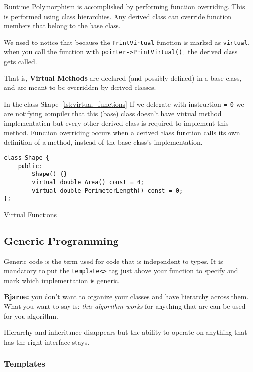 \documentclass[11pt, a4paper]{article}
\begin{document}
Runtime Polymorphism is accomplished by performing function overriding. This is performed using class hierarchies. Any derived class can override function members that belong to the base class.

We need to notice that because the \texttt{PrintVirtual} function is marked as \texttt{virtual}, when you call the function with \texttt{pointer->PrintVirtual();} the derived class gets called.

That is, \textbf{Virtual Methods} are declared (and possibly defined) in a base class, and are meant to be overridden by derived classes.


In the class Shape~\ref{lst:virtual_functions} If we delegate with instruction \texttt{= 0} we are notifying compiler that this (base) class doesn't have virtual method implementation but every other derived class is required to implement this method.
Function overriding occurs when a derived class function calls its own definition of a method, instead of the base class's implementation. 

\begin{listing}
\begin{verbatim}
class Shape {
	public:
		Shape() {}
		virtual double Area() const = 0;
		virtual double PerimeterLength() const = 0;
};
\end{verbatim}
\caption{Virtual Functions}
\label{lst:virtual_functions}
\end{listing}






\subsection{Generic Programming}%
\label{ssub:generic_programming}

Generic code is the term used for code that is independent to types. It is mandatory to put the \texttt{template<>} tag just above your function to specify and mark which implementation is generic.


\textbf{Bjarne:} you don't want to organize your classes and have hierarchy across them. What you want to say is: \textit{this algorithm works} for anything that are can be used for you algorithm. 


Hierarchy and inheritance disappears but the ability to operate on anything that has the right interface stays. 

\subsubsection{Templates}%
\label{ssub:templates}
\end{document}
